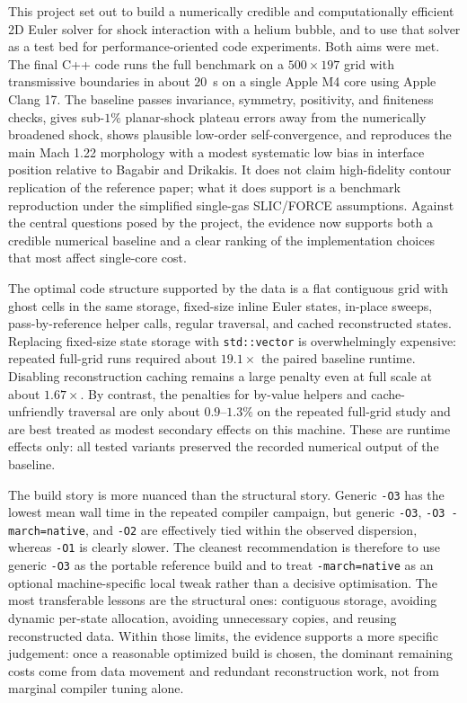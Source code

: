 \documentclass[final,3p,times,twocolumn]{elsarticle}
\begin{document}
This project set out to build a numerically credible and computationally efficient 2D Euler solver for shock interaction with a helium bubble, and to use that solver as a test bed for performance-oriented code experiments. Both aims were met. The final C++ code runs the full benchmark on a $500 \times 197$ grid with transmissive boundaries in about $20$~s on a single Apple M4 core using Apple Clang 17. The baseline passes invariance, symmetry, positivity, and finiteness checks, gives sub-$1\%$ planar-shock plateau errors away from the numerically broadened shock, shows plausible low-order self-convergence, and reproduces the main Mach 1.22 morphology with a modest systematic low bias in interface position relative to Bagabir and Drikakis. It does not claim high-fidelity contour replication of the reference paper; what it does support is a benchmark reproduction under the simplified single-gas SLIC/FORCE assumptions. Against the central questions posed by the project, the evidence now supports both a credible numerical baseline and a clear ranking of the implementation choices that most affect single-core cost.

The optimal code structure supported by the data is a flat contiguous grid with ghost cells in the same storage, fixed-size inline Euler states, in-place sweeps, pass-by-reference helper calls, regular traversal, and cached reconstructed states. Replacing fixed-size state storage with \texttt{std::vector} is overwhelmingly expensive: repeated full-grid runs required about $19.1\times$ the paired baseline runtime. Disabling reconstruction caching remains a large penalty even at full scale at about $1.67\times$. By contrast, the penalties for by-value helpers and cache-unfriendly traversal are only about $0.9$--$1.3\%$ on the repeated full-grid study and are best treated as modest secondary effects on this machine. These are runtime effects only: all tested variants preserved the recorded numerical output of the baseline.

The build story is more nuanced than the structural story. Generic \texttt{-O3} has the lowest mean wall time in the repeated compiler campaign, but generic \texttt{-O3}, \texttt{-O3 -march=native}, and \texttt{-O2} are effectively tied within the observed dispersion, whereas \texttt{-O1} is clearly slower. The cleanest recommendation is therefore to use generic \texttt{-O3} as the portable reference build and to treat \texttt{-march=native} as an optional machine-specific local tweak rather than a decisive optimisation. The most transferable lessons are the structural ones: contiguous storage, avoiding dynamic per-state allocation, avoiding unnecessary copies, and reusing reconstructed data. Within those limits, the evidence supports a more specific judgement: once a reasonable optimized build is chosen, the dominant remaining costs come from data movement and redundant reconstruction work, not from marginal compiler tuning alone.
\end{document}

